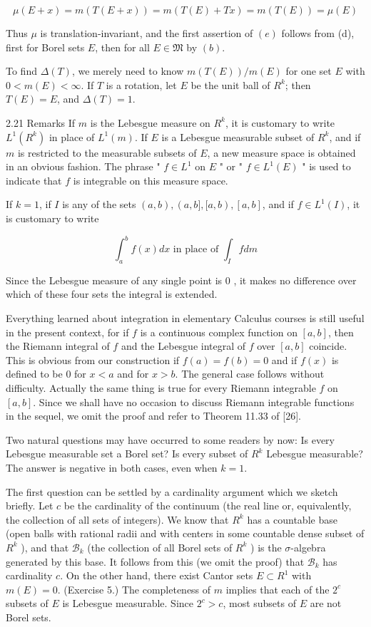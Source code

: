 \documentclass[10pt]{article}
\begin{document}
$$
\mu(E+x)=m(T(E+x))=m(T(E)+T x)=m(T(E))=\mu(E)
$$

Thus $\mu$ is translation-invariant, and the first assertion of $(e)$ follows from (d), first for Borel sets $E$, then for all $E \in \mathfrak{M}$ by $(b)$.

To find $\Delta(T)$, we merely need to know $m(T(E)) / m(E)$ for one set $E$ with $0<m(E)<\infty$. If $T$ is a rotation, let $E$ be the unit ball of $R^{k}$; then $T(E)=E$, and $\Delta(T)=1$.

2.21 Remarks If $m$ is the Lebesgue measure on $R^{k}$, it is customary to write $L^{1}\left(R^{k}\right)$ in place of $L^{1}(m)$. If $E$ is a Lebesgue measurable subset of $R^{k}$, and if $m$ is restricted to the measurable subsets of $E$, a new measure space is obtained in an obvious fashion. The phrase " $f \in L^{1}$ on $E$ " or " $f \in L^{1}(E)$ " is used to indicate that $f$ is integrable on this measure space.

If $k=1$, if $I$ is any of the sets $(a, b),(a, b],[a, b),[a, b]$, and if $f \in L^{1}(I)$, it is customary to write

$$
\int_{a}^{b} f(x) d x \text { in place of } \int_{I} f d m
$$

Since the Lebesgue measure of any single point is 0 , it makes no difference over which of these four sets the integral is extended.

Everything learned about integration in elementary Calculus courses is still useful in the present context, for if $f$ is a continuous complex function on $[a, b]$, then the Riemann integral of $f$ and the Lebesgue integral of $f$ over $[a, b]$ coincide. This is obvious from our construction if $f(a)=f(b)=0$ and if $f(x)$ is defined to be 0 for $x<a$ and for $x>b$. The general case follows without difficulty. Actually the same thing is true for every Riemann integrable $f$ on $[a, b]$. Since we shall have no occasion to discuss Riemann integrable functions in the sequel, we omit the proof and refer to Theorem 11.33 of [26].

Two natural questions may have occurred to some readers by now: Is every Lebesgue measurable set a Borel set? Is every subset of $R^{k}$ Lebesgue measurable? The answer is negative in both cases, even when $k=1$.

The first question can be settled by a cardinality argument which we sketch briefly. Let $c$ be the cardinality of the continuum (the real line or, equivalently, the collection of all sets of integers). We know that $R^{k}$ has a countable base (open balls with rational radii and with centers in some countable dense subset of $R^{k}$ ), and that $\mathscr{B}_{k}$ (the collection of all Borel sets of $R^{k}$ ) is the $\sigma$-algebra generated by this base. It follows from this (we omit the proof) that $\mathscr{B}_{k}$ has cardinality $c$. On the other hand, there exist Cantor sets $E \subset R^{1}$ with $m(E)=0$. (Exercise 5.) The completeness of $m$ implies that each of the $2^{c}$ subsets of $E$ is Lebesgue measurable. Since $2^{c}>c$, most subsets of $E$ are not Borel sets.
\end{document}
